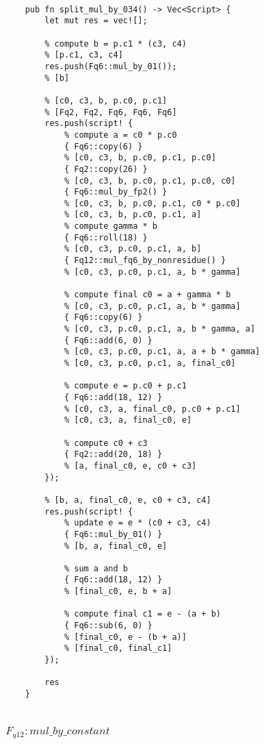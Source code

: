 \begin{lstlisting}

    pub fn split_mul_by_034() -> Vec<Script> {
        let mut res = vec![];

        % compute b = p.c1 * (c3, c4)
        % [p.c1, c3, c4]
        res.push(Fq6::mul_by_01());
        % [b]

        % [c0, c3, b, p.c0, p.c1]
        % [Fq2, Fq2, Fq6, Fq6, Fq6]
        res.push(script! {
            % compute a = c0 * p.c0
            { Fq6::copy(6) }
            % [c0, c3, b, p.c0, p.c1, p.c0]
            { Fq2::copy(26) }
            % [c0, c3, b, p.c0, p.c1, p.c0, c0]
            { Fq6::mul_by_fp2() }
            % [c0, c3, b, p.c0, p.c1, c0 * p.c0]
            % [c0, c3, b, p.c0, p.c1, a]
            % compute gamma * b
            { Fq6::roll(18) }
            % [c0, c3, p.c0, p.c1, a, b]
            { Fq12::mul_fq6_by_nonresidue() }
            % [c0, c3, p.c0, p.c1, a, b * gamma]

            % compute final c0 = a + gamma * b
            % [c0, c3, p.c0, p.c1, a, b * gamma]
            { Fq6::copy(6) }
            % [c0, c3, p.c0, p.c1, a, b * gamma, a]
            { Fq6::add(6, 0) }
            % [c0, c3, p.c0, p.c1, a, a + b * gamma]
            % [c0, c3, p.c0, p.c1, a, final_c0]

            % compute e = p.c0 + p.c1
            { Fq6::add(18, 12) }
            % [c0, c3, a, final_c0, p.c0 + p.c1]
            % [c0, c3, a, final_c0, e]

            % compute c0 + c3
            { Fq2::add(20, 18) }
            % [a, final_c0, e, c0 + c3]
        });

        % [b, a, final_c0, e, c0 + c3, c4]
        res.push(script! {
            % update e = e * (c0 + c3, c4)
            { Fq6::mul_by_01() }
            % [b, a, final_c0, e]

            % sum a and b
            { Fq6::add(18, 12) }
            % [final_c0, e, b + a]

            % compute final c1 = e - (a + b)
            { Fq6::sub(6, 0) }
            % [final_c0, e - (b + a)]
            % [final_c0, final_c1]
        });

        res
    }
    
\end{lstlisting}


\subsubsection{$F_{q12}: mul\_by\_constant$}

